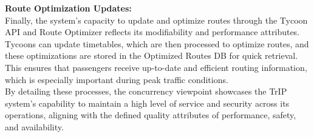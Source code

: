 \noindent \textbf{Route Optimization Updates:} \\
Finally, the system’s capacity to update and optimize routes through the Tycoon API and Route Optimizer reflects its modifiability and performance attributes. Tycoons can update timetables, which are then processed to optimize routes, and these optimizations are stored in the Optimized Routes DB for quick retrieval. This ensures that passengers receive up-to-date and efficient routing information, which is especially important during peak traffic conditions. \\

By detailing these processes, the concurrency viewpoint showcases the TrIP system's capability to maintain a high level of service and security across its operations, aligning with the defined quality attributes of performance, safety, and availability.